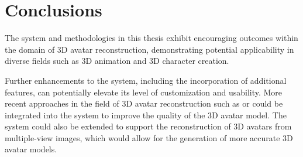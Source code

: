 \section{Conclusions}\label{sec:conclusions}

The system and methodologies in this thesis exhibit encouraging outcomes within the domain of 3D avatar reconstruction, demonstrating potential applicability in diverse fields such as 3D animation and 3D character creation.

Further enhancements to the system, including the incorporation of additional features, can potentially elevate its level of customization and usability. More recent approaches in the field of 3D avatar reconstruction such as  or  could be integrated into the system to improve the quality of the 3D avatar model. The system could also be extended to support the reconstruction of 3D avatars from multiple-view images, which would allow for the generation of more accurate 3D avatar models.